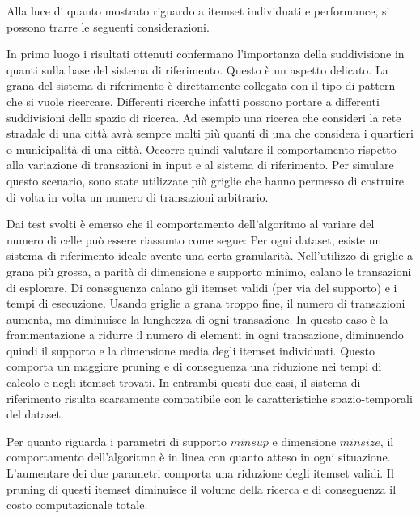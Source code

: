 Alla luce di quanto mostrato riguardo a itemset individuati e performance, si possono trarre le seguenti considerazioni.

In primo luogo i risultati ottenuti confermano l'importanza della suddivisione in quanti sulla base del sistema di riferimento. 
Questo è un aspetto delicato. 
La grana del sistema di riferimento è direttamente collegata con il tipo di pattern che si vuole ricercare.
Differenti ricerche infatti possono portare a differenti suddivisioni dello spazio di ricerca.
Ad esempio una ricerca che consideri la rete stradale di una città avrà sempre molti più quanti di una che considera i quartieri o municipalità di una città.
Occorre quindi valutare il comportamento rispetto alla variazione di transazioni in input e al sistema di riferimento.
Per simulare questo scenario, sono state utilizzate più griglie che hanno permesso di costruire di volta in volta un numero di transazioni arbitrario.

Dai test svolti è emerso che il comportamento dell'algoritmo al variare del numero di celle può essere riassunto come segue:
Per ogni dataset, esiste un sistema di riferimento ideale avente una certa granularità.
Nell'utilizzo di griglie a grana più grossa, a parità di dimensione e supporto minimo, calano le transazioni di esplorare.
Di conseguenza calano gli itemset validi (per via del supporto) e i tempi di esecuzione.
Usando griglie a grana troppo fine, il numero di transazioni aumenta, ma diminuisce la lunghezza di ogni transazione.
In questo caso è la frammentazione a ridurre il numero di elementi in ogni transazione, diminuendo quindi il supporto e la dimensione media degli itemset individuati.
Questo comporta un maggiore pruning e di conseguenza una riduzione nei tempi di calcolo e negli itemset trovati.
In entrambi questi due casi, il sistema di riferimento risulta scarsamente compatibile con le caratteristiche spazio-temporali del dataset.

Per quanto riguarda i parametri di supporto \(minsup\) e dimensione \(minsize\), il comportamento dell'algoritmo è in linea con quanto atteso in ogni situazione.
L'aumentare dei due parametri comporta una riduzione degli itemset validi.
Il pruning di questi itemset diminuisce il volume della ricerca e di conseguenza il costo computazionale totale. 

